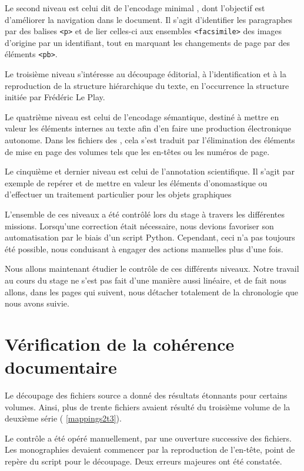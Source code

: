 Le second niveau est celui dit de l'encodage \og minimal \fg, dont l'objectif est d'améliorer la navigation dans le document. Il s'agit d'identifier les paragraphes par des balises \texttt{<p>} et de lier celles-ci aux ensembles \texttt{<facsimile>} des images d'origine par un identifiant, tout en marquant les changements de page par des éléments \texttt{<pb>}.

Le troisième niveau s'intéresse au découpage éditorial, \cad{} à l'identification et à la reproduction de la structure hiérarchique du texte, en l'occurrence la structure initiée par Frédéric Le Play.

Le quatrième niveau est celui de l'encodage sémantique, destiné à mettre en valeur les éléments internes au texte afin d'en faire une production électronique autonome. Dans les fichiers des \odm, cela s'est traduit par l'élimination des éléments de mise en page des volumes tels que les en-têtes ou les numéros de page.

Le cinquième et dernier niveau est celui de l'annotation scientifique. Il s'agit par exemple de repérer et de mettre en valeur les éléments d'onomastique ou d'effectuer un traitement particulier pour les objets graphiques

L'ensemble de ces niveaux a été contrôlé lors du stage à travers les différentes missions. Lorsqu'une correction était nécessaire, nous devions favoriser son automatisation par le biais d'un script Python. Cependant, ceci n’a pas toujours été possible, nous conduisant à engager des actions manuelles plus d'une fois.

Nous allons maintenant étudier le contrôle de ces différents niveaux. Notre travail au cours du stage ne s'est pas fait d'une manière aussi linéaire, et de fait nous allons,  dans les pages qui suivent, nous détacher totalement de la chronologie que nous avons suivie.

\section{Vérification de la cohérence documentaire}

Le découpage des fichiers source a donné des résultats étonnants pour certains volumes. Ainsi, plus de trente fichiers avaient résulté du troisième volume de la deuxième série (\ann{} \ref{mappings2t3}).

Le contrôle a été opéré manuellement, par une ouverture successive des fichiers. Les monographies devaient commencer par la reproduction de l'en-tête, point de repère du script \lse{} pour le découpage. Deux erreurs majeures ont été constatée.

